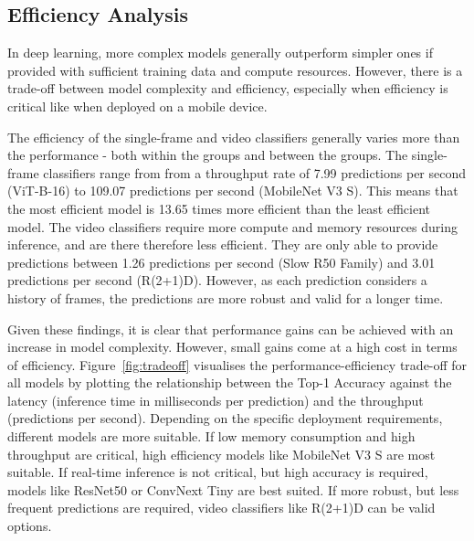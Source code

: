 \documentclass[a4paper]{article}
\begin{document}
\subsection{Efficiency Analysis} %
\label{sub:efficiency}

In deep learning, more complex models generally outperform simpler ones if
provided with sufficient training data and compute resources. However, there is
a trade-off between model complexity and efficiency, especially when efficiency
is critical like when deployed on a mobile device.

The efficiency of the single-frame and video classifiers generally varies more
than the performance - both within the groups and between the groups. The
single-frame classifiers range from from a throughput rate of 7.99 predictions
per second (ViT-B-16) to 109.07 predictions per second (MobileNet V3 S). This
means that the most efficient model is 13.65 times more efficient than the least
efficient model. The video classifiers require more compute and memory resources
during inference, and are there therefore less efficient. They are only able to
provide predictions between 1.26 predictions per second (Slow R50 Family) and
3.01 predictions per second (R(2+1)D). However, as each prediction considers a
history of frames, the predictions are more robust and valid for a longer time.

Given these findings, it is clear that performance gains can be achieved with an
increase in model complexity. However, small gains come at a high cost in terms
of efficiency. Figure~\ref{fig:tradeoff} visualises the performance-efficiency
trade-off for all models by plotting the relationship between the Top-1 Accuracy
against the latency (inference time in milliseconds per prediction) and the
throughput (predictions per second). Depending on the specific deployment
requirements, different models are more suitable. If low memory consumption and
high throughput are critical, high efficiency models like MobileNet V3 S are
most suitable. If real-time inference is not critical, but high accuracy is
required, models like ResNet50 or ConvNext Tiny are best suited. If more robust,
but less frequent predictions are required, video classifiers like R(2+1)D can
be valid options.
\end{document}
